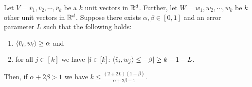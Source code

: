 \begin{lemma}
\label{lemma:generalized-skew-obtuse_lemma}
    Let $V= \bar{v}_1,\bar{v}_2,\cdots, \bar{v}_k$ be a $k$ unit vectors in $\mathbb{R}^d$. Further, let  $W = w_1,w_2,\cdots, w_k$ be $k$ other unit vectors in $\mathbb{R}^d$. Suppose there exists $\alpha,\beta\in [0,1]$ and an error parameter $L$ such that the following holds:
    \begin{enumerate}
        \item $\langle \bar{v}_i, w_i\rangle \geq \alpha$ and
        \item for all $j\in [k]$ we have $\left|i\in[k]\colon  \langle \bar{v}_i, w_j\rangle \leq -\beta\right|\geq k-1-L$. 
    \end{enumerate}
     Then, if $\alpha+2\beta>1$ we have $ k \leq \frac{(2+2L)(1+\beta)}{\alpha+2\beta-1}.$
\end{lemma}



